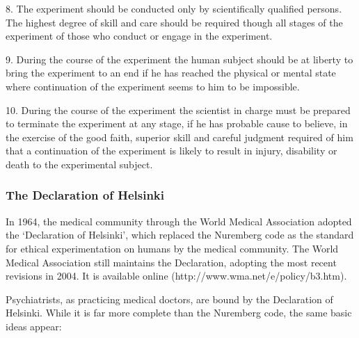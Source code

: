 {{8.  The experiment should be conducted only by scientifically qualified persons. The highest degree of skill and care should be required though all stages of the experiment of those who conduct or engage in the experiment.

9.  During the course of the experiment the human subject should be at liberty to bring the experiment to an end if he has reached the physical or mental state where continuation of the experiment seems to him to be impossible.

10. During the course of the experiment the scientist in charge must be prepared to terminate the experiment at any stage, if he has probable cause to believe, in the exercise of the good faith, superior skill and careful judgment required of him that a continuation of the experiment is likely to result in injury, disability or death to the experimental subject.
}} 

\subsubsection{The Declaration of Helsinki}
\label{thedeclarationofhelsinki}

In 1964, the medical community through the World Medical Association adopted the `Declaration of Helsinki', which replaced the Nuremberg code as the standard for ethical experimentation on humans by the medical community. The World Medical Association still maintains the Declaration, adopting the most recent revisions in 2004. It is available online (http:\slash \slash www.wma.net\slash e\slash policy\slash b3.htm).

Psychiatrists, as practicing medical doctors, are bound by the Declaration of Helsinki. While it is far more complete than the Nuremberg code, the same basic ideas appear:

